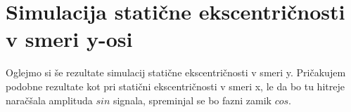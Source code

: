 %
%
%


\section{Simulacija statične ekscentričnosti v smeri y-osi}

Oglejmo si še rezultate simulacij statične ekscentričnosti v smeri y. Pričakujem podobne rezultate kot pri statični ekscentričnosti v smeri x, le da bo tu hitreje naračšala amplituda $sin$ signala, spreminjal se bo fazni zamik $cos$.
 

